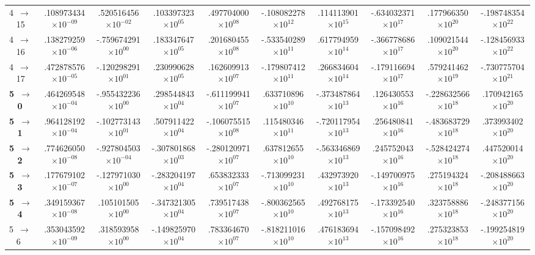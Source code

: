 \documentclass[reviewcopy]{elsarticle}
\begin{document}
\begin{landscape}
\begin{longtable}{lccccccccc}
 4~$\to$~ 15 &  .108973434$\times10^{-09}$  &  .520516456$\times10^{-02}$&  .103397323$\times10^{05}$ &  .497704000$\times10^{08}$ & -.108082278$\times10^{12}$ &  .114113901$\times10^{15}$ & -.634032371$\times10^{17}$ & .177966350$\times10^{20}$ & -.198748354$\times10^{22}$ \\
 4~$\to$~ 16 &  .138279259$\times10^{-06}$  & -.759674291$\times10^{00}$ &  .183347647$\times10^{05}$ &  .201680455$\times10^{08}$ & -.533540289$\times10^{11}$ &  .617794959$\times10^{14}$ & -.366778686$\times10^{17}$ & .109021544$\times10^{20}$ & -.128456933$\times10^{22}$ \\
 4~$\to$~ 17 &  .472878576$\times10^{-05}$  & -.120298291$\times10^{01}$ &  .230990628$\times10^{05}$ &  .162609913$\times10^{07}$ & -.179807412$\times10^{11}$ &  .266834604$\times10^{14}$ & -.179116694$\times10^{17}$ & .579241462$\times10^{19}$ & -.730775704$\times10^{21}$ \\[7pt]
{\bf 5~$\to$~ 0}  &   .464269548$\times10^{-04}$ & -.955432236$\times10^{00}$ &  .298544843$\times10^{04}$ & -.611199941$\times10^{07}$ &  .633710896$\times10^{10}$ & -.373487864$\times10^{13}$ &  .126430553$\times10^{16}$ & -.228632566$\times10^{18}$ &  .170942165$\times10^{20}$ \\
{\bf 5~$\to$~ 1}  &   .964128192$\times10^{-04}$ & -.102773143$\times10^{01}$ &  .507911422$\times10^{04}$ & -.106075515$\times10^{08}$ &  .115480346$\times10^{11}$ & -.720117954$\times10^{13}$ &  .256480841$\times10^{16}$ & -.483683729$\times10^{18}$ &  .373993402$\times10^{20}$ \\
{\bf 5~$\to$~ 2}  &   .774626050$\times10^{-08}$ & -.927804503$\times10^{-04}$ & -.307801868$\times10^{03}$ & -.280120971$\times10^{07}$ &  .637812655$\times10^{10}$ & -.563346869$\times10^{13}$ &  .245752043$\times10^{16}$ & -.528424274$\times10^{18}$ &  .447520014$\times10^{20}$ \\
{\bf 5~$\to$~ 3}  &   .177679102$\times10^{-07}$ & -.127971030$\times10^{00}$ & -.283204197$\times10^{04}$ &  .653832333$\times10^{07}$ & -.713099231$\times10^{10}$ &  .432973920$\times10^{13}$ & -.149700975$\times10^{16}$ &  .275194324$\times10^{18}$ & -.208488663$\times10^{20}$ \\
{\bf 5~$\to$~ 4}  &   .349159367$\times10^{-08}$ &  .105101505$\times10^{00}$ & -.347321305$\times10^{04}$ &  .739517438$\times10^{07}$ & -.800362565$\times10^{10}$ &  .492768175$\times10^{13}$ & -.173392540$\times10^{16}$ &  .323758886$\times10^{18}$ & -.248377156$\times10^{20}$ \\
 5~$\to$~ 6  &   .353043592$\times10^{-09}$ &  .318593958$\times10^{00}$ & -.149825970$\times10^{04}$ &  .783364670$\times10^{07}$ & -.818211016$\times10^{10}$ &  .476183694$\times10^{13}$ & -.157098492$\times10^{16}$ &  .275323853$\times10^{18}$ & -.199254819$\times10^{20}$ \\

\end{longtable}
\end{landscape}
\end{document}
